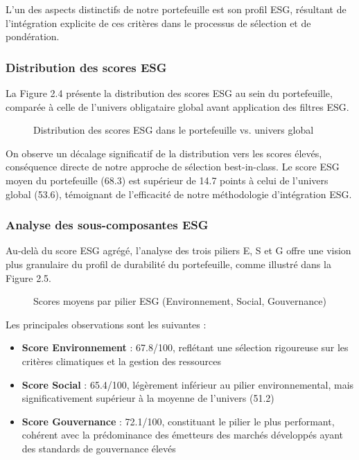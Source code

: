 L'un des aspects distinctifs de notre portefeuille est son profil ESG, résultant de l'intégration explicite de ces critères dans le processus de sélection et de pondération.

\subsubsection{Distribution des scores ESG}

La Figure 2.4 présente la distribution des scores ESG au sein du portefeuille, comparée à celle de l'univers obligataire global avant application des filtres ESG.

\begin{figure}[h]
\centering
\caption{Distribution des scores ESG dans le portefeuille vs. univers global}
\end{figure}

On observe un décalage significatif de la distribution vers les scores élevés, conséquence directe de notre approche de sélection best-in-class. Le score ESG moyen du portefeuille (68.3) est supérieur de 14.7 points à celui de l'univers global (53.6), témoignant de l'efficacité de notre méthodologie d'intégration ESG.

\subsubsection{Analyse des sous-composantes ESG}

Au-delà du score ESG agrégé, l'analyse des trois piliers E, S et G offre une vision plus granulaire du profil de durabilité du portefeuille, comme illustré dans la Figure 2.5.

\begin{figure}[h]
\centering
\caption{Scores moyens par pilier ESG (Environnement, Social, Gouvernance)}
\end{figure}

Les principales observations sont les suivantes :

\begin{itemize}
    \item \textbf{Score Environnement} : 67.8/100, reflétant une sélection rigoureuse sur les critères climatiques et la gestion des ressources
    
    \item \textbf{Score Social} : 65.4/100, légèrement inférieur au pilier environnemental, mais significativement supérieur à la moyenne de l'univers (51.2)
    
    \item \textbf{Score Gouvernance} : 72.1/100, constituant le pilier le plus performant, cohérent avec la prédominance des émetteurs des marchés développés ayant des standards de gouvernance élevés
\end{itemize}

